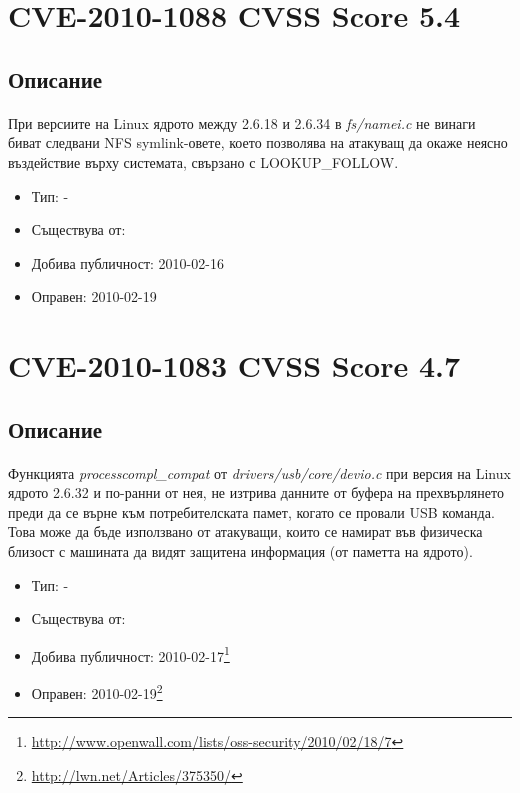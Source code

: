 \documentclass[a4paper,12pt,leqno]{article}
\begin{document}
\section{CVE-2010-1088 CVSS Score 5.4}
\subsection{Описание}
\paragraph{}
При версиите на Linux ядрото между 2.6.18 и 2.6.34 в \textit{fs/namei.c} не винаги биват 
следвани NFS symlink-овете, което позволява на атакуващ да 
окаже неясно въздействие върху системата, свързано с LOOKUP\_FOLLOW.

\begin{itemize}
    \item Тип: -
    \item Съществува от:
  	\item Добива публичност: 2010-02-16
    \item Оправен: 2010-02-19
\end{itemize}

\section{CVE-2010-1083 CVSS Score 4.7}
\subsection{Описание}
\paragraph{}
Функцията \textit{processcompl\_compat} от \textit{drivers/usb/core/devio.c} при версия на Linux 
ядрото 2.6.32 и по-ранни от нея, не изтрива данните от буфера на 
прехвърлянето преди да се върне към потребителската памет, когато се 
провали USB команда. Това може да бъде използвано от атакуващи, които се 
намират във физическа близост с машината да видят защитена информация 
(от паметта на ядрото).


\begin{itemize}
    \item Тип: -
    \item Съществува от:
  	\item Добива публичност: 2010-02-17\footnote{\url{http://www.openwall.com/lists/oss-security/2010/02/18/7}}
    \item Оправен: 2010-02-19\footnote{\url{http://lwn.net/Articles/375350/}}
\end{itemize}
\end{document}
